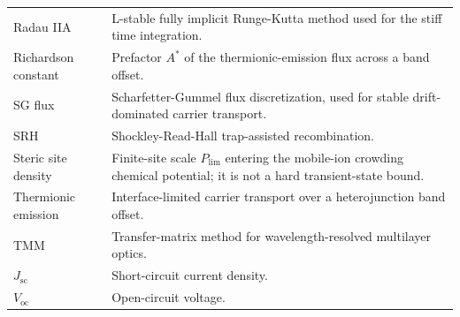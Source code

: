 \documentclass[
  11pt,
  american,
]{report}
\begin{document}
\begin{longtable}[]{@{}
  >{\raggedright\arraybackslash}p{}
  >{\raggedright\arraybackslash}p{}@{}}
Radau IIA & L-stable fully implicit Runge-Kutta method used for the
stiff time integration. \\
Richardson constant & Prefactor \(A^{*}\) of the thermionic-emission
flux across a band offset. \\
SG flux & Scharfetter-Gummel flux discretization, used for stable
drift-dominated carrier transport. \\
SRH & Shockley-Read-Hall trap-assisted recombination. \\
Steric site density & Finite-site scale \(P_\mathrm{lim}\) entering the
mobile-ion crowding chemical potential; it is not a hard transient-state
bound. \\
Thermionic emission & Interface-limited carrier transport over a
heterojunction band offset. \\
TMM & Transfer-matrix method for wavelength-resolved multilayer
optics. \\
\(J_\mathrm{sc}\) & Short-circuit current density. \\
\(V_\mathrm{oc}\) & Open-circuit voltage. \\
\bottomrule
\end{longtable}
\end{document}
